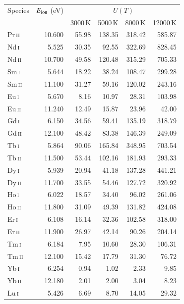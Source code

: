 \documentclass[traditabstract]{aa}
\newcommand{\alteui}{Eu\,\textsc{i}}
\newcommand{\alteuii}{Eu\,\textsc{ii}}
\newcommand{\altsmi}{Sm\,\textsc{i}}
\newcommand{\altsmii}{Sm\,\textsc{ii}}
\newcommand{\alttbi}{Tb\,\textsc{i}}
\newcommand{\alttbii}{Tb\,\textsc{ii}}
\newcommand{\altprii}{Pr\,\textsc{ii}}
\newcommand{\altdyi}{Dy\,\textsc{i}}
\newcommand{\altdyii}{Dy\,\textsc{ii}}
\newcommand{\altndi}{Nd\,\textsc{i}}
\newcommand{\altndii}{Nd\,\textsc{ii}}
\newcommand{\altgdi}{Gd\,\textsc{i}}
\newcommand{\altgdii}{Gd\,\textsc{ii}}
\newcommand{\althoi}{Ho\,\textsc{i}}
\newcommand{\althoii}{Ho\,\textsc{ii}}
\newcommand{\alteri}{Er\,\textsc{i}}
\newcommand{\alterii}{Er\,\textsc{ii}}
\newcommand{\altlui}{Lu\,\textsc{i}}
\newcommand{\altybi}{Yb\,\textsc{i}}
\newcommand{\altybii}{Yb\,\textsc{ii}}
\newcommand{\alttmi}{Tm\,\textsc{i}}
\newcommand{\alttmii}{Tm\,\textsc{ii}}
\newcommand{\eui}{\alteui\ }
\newcommand{\euii}{\alteuii\ }
\newcommand{\smi}{\altsmi\ }
\newcommand{\smii}{\altsmii\ }
\newcommand{\tbi}{\alttbi\ }
\newcommand{\tbii}{\alttbii\ }
\newcommand{\prii}{\altprii\ }
\newcommand{\dyi}{\altdyi\ }
\newcommand{\dyii}{\altdyii\ }
\newcommand{\ndi}{\altndi\ }
\newcommand{\ndii}{\altndii\ }
\newcommand{\gdi}{\altgdi\ }
\newcommand{\gdii}{\altgdii\ }
\newcommand{\hoi}{\althoi\ }
\newcommand{\hoii}{\althoii\ }
\newcommand{\eri}{\alteri\ }
\newcommand{\erii}{\alterii\ }
\newcommand{\lui}{\altlui\ }
\newcommand{\tmi}{\alttmi\ }
\newcommand{\tmii}{\alttmii\ }
\newcommand{\ybi}{\altybi\ }
\newcommand{\ybii}{\altybii\ }
\begin{document}
\begin{table}
\begin{minipage}{\columnwidth}
\begin{tabular}{l r r r r r}
\hline
\hline Species & $E_{\rm ion}$ (eV) &  \multicolumn{4}{c}{$U(T)$} \\
               &                    & 3000\,K & 5000\,K & 8000\,K & 12000\,K \\
\hline
  \prii &  10.600 &     55.98 &    138.35 &    318.42 &    585.87 \\
  \ndi  &   5.525 &     30.35 &     92.55 &    322.69 &    828.45 \\
  \ndii &  10.700 &     49.58 &    120.48 &    315.29 &    705.33 \\
  \smi  &   5.644 &     18.22 &     38.24 &    108.47 &    299.28 \\
  \smii &  11.100 &     31.27 &     59.16 &    120.02 &    243.16 \\
  \eui  &   5.670 &      8.16 &     10.97 &     28.31 &    103.98 \\
  \euii &  11.240 &     12.49 &     15.87 &     23.96 &     42.00 \\
  \gdi  &   6.150 &     34.56 &     59.41 &    135.19 &    318.79 \\
  \gdii &  12.100 &     48.42 &     83.38 &    146.39 &    249.09 \\
  \tbi  &   5.864 &     90.06 &    165.84 &    348.95 &    703.54 \\
  \tbii &  11.500 &     53.44 &    102.16 &    181.93 &    293.33 \\
  \dyi  &   5.939 &     20.94 &     41.18 &    137.28 &    441.21 \\
  \dyii &  11.700 &     33.55 &     54.46 &    127.72 &    320.92 \\
  \hoi  &   6.022 &     18.57 &     34.40 &     96.02 &    261.06 \\
  \hoii &  11.800 &     31.09 &     49.39 &    131.82 &    424.08 \\
  \eri  &   6.108 &     16.14 &     32.36 &    102.58 &    318.00 \\
  \erii &  11.900 &     26.97 &     42.14 &     90.26 &    204.14 \\
  \tmi  &   6.184 &      7.95 &     10.60 &     28.30 &    106.31 \\
  \tmii &  12.100 &     15.42 &     17.79 &     31.30 &     76.72 \\
  \ybi  &   6.254 &      0.94 &      1.02 &      2.33 &      9.85 \\
  \ybii &  12.180 &      2.01 &      2.00 &      3.04 &      8.23 \\
  \lui  &   5.426 &      6.69 &      8.70 &     14.05 &     29.32 \\

\end{tabular}
\end{minipage}
\end{table}
\end{document}
